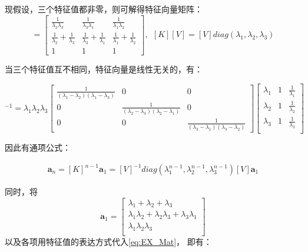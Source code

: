 \documentclass[UTF8,zihao=5]{ctexart}
\newcommand{\bm}[1]{{\mathbf{#1}}}
\begin{document}
现假设，三个特征值都非零，则可解得特征向量矩阵：
\begin{equation}
    [V]=\begin{bmatrix}
        \frac{1}{\lambda_2\lambda_3}            &
        \frac{1}{\lambda_3\lambda_1}            &
        \frac{1}{\lambda_1\lambda_2}                    \\
        \frac{1}{\lambda_2}+\frac{1}{\lambda_3} &
        \frac{1}{\lambda_3}+\frac{1}{\lambda_1} &
        \frac{1}{\lambda_1}+\frac{1}{\lambda_2}         \\
        1                                       & 1 & 1
    \end{bmatrix},\ \ [K][V]=[V]diag(\lambda_1,\lambda_2,\lambda_3)
\end{equation}

当三个特征值互不相同，特征向量是线性无关的，有：

\begin{equation}
    [V]^{-1}=\lambda_1\lambda_2\lambda_3
    \begin{bmatrix}
        \frac{1}{(\lambda_1-\lambda_2)(\lambda_1-\lambda_3)}
          & 0 & 0 \\
        0 &
        \frac{1}{(\lambda_2-\lambda_3)(\lambda_2-\lambda_1)}
          & 0     \\
        0 & 0 &
        \frac{1}{(\lambda_3-\lambda_1)(\lambda_3-\lambda_2)}
    \end{bmatrix}\begin{bmatrix}
        \lambda_1 & 1 & \frac{1}{\lambda_1} \\
        \lambda_2 & 1 & \frac{1}{\lambda_2} \\
        \lambda_3 & 1 & \frac{1}{\lambda_3} \\
    \end{bmatrix}
\end{equation}

因此有通项公式：

\begin{equation}
    \begin{aligned}
        \bm{a}_n=[K]^{n-1}\bm{a}_1
        =[V]^{-1}diag(\lambda_1^{n-1},\lambda_2^{n-1},\lambda_3^{n-1})[V]\bm{a}_1
    \end{aligned}
    \label{eq:EX_Mat}
\end{equation}

同时，将
$$
    \bm{a}_1=\begin{bmatrix}
        \lambda_1+\lambda_2+\lambda_3                            \\
        \lambda_1\lambda_2+\lambda_2\lambda_3+\lambda_3\lambda_1 \\
        \lambda_1\lambda_2\lambda_3                              \\
    \end{bmatrix}
$$
以及各项用特征值的表达方式代入\eqref{eq:EX_Mat}，
即有：
\end{document}

